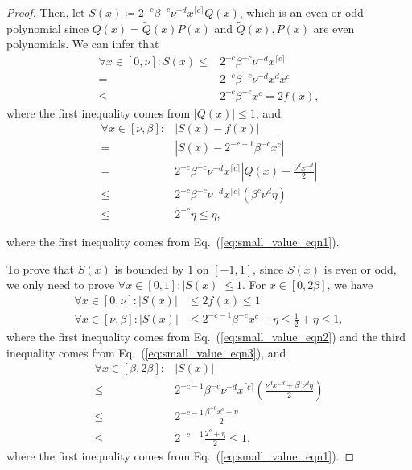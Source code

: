 \documentclass[journal]{IEEEtran}
\newcommand{\eq}[1]{Eq.~(\ref{eq:#1})}
\begin{document}
\begin{proof}
  Then, let $S(x) \coloneqq 2^{-c}\beta^{-c}\nu^{-d}x^{\lceil c\rceil}Q(x)$, which is an even or odd polynomial since $Q(x) = \tilde{Q}(x)P(x)$ and $\tilde{Q}(x),P(x)$ are even polynomials. We can infer that
  \begin{align}
    \label{eq:small_value_eqn2}
    \forall x \in [0,\nu]: S(x)\le & 2^{-c}\beta^{-c}\nu^{-d}x^{\lceil c \rceil} \nonumber \\= &  2^{-c}\beta^{-c}\nu^{-d}x^{d}x^{c} \nonumber \\ \le &  2^{-c}\beta^{-c}x^{c} = 2f(x),
  \end{align}
  where the first inequality comes from $|Q(x)|\le 1$, and
  \begin{align}
      \label{eq:small_value_eqn3}
      \forall x \in[\nu,\beta]: &|S(x)-f(x)| \nonumber \\
      = & |S(x)-2^{-c-1}\beta^{-c}x^c| \nonumber \\ =&2^{-c}\beta^{-c}\nu^{-d}x^{\lceil c \rceil}|Q(x)-\frac{\nu^dx^{-d}}{2}| \nonumber\\
      \le & 2^{-c}\beta^{-c}\nu^{-d}x^{\lceil c \rceil}(\beta^c\nu^d\eta)        \nonumber\\
      \le & 2^{-c}\eta \le \eta,
  \end{align}
  
  where the first inequality comes from \eq{small_value_eqn1}.

  To prove that $S(x)$ is bounded by $1$ on $[-1,1]$, since $S(x)$ is even or odd, we only need to prove $\forall x\in [0,1]: |S(x)|\le 1$.
  For $x\in[0,2\beta]$, we have
  \begin{align}
    \forall x \in [0,\nu]:|S(x)|     & \le 2f(x) \le 1   \nonumber                 \\
    \forall x\in [\nu,\beta]: |S(x)| & \le 2^{-c-1}\beta^{-c}x^{c} + \eta
    \le \frac{1}{2} + \eta
    \le 1                              ,
  \end{align}
  where the first inequality comes from \eq{small_value_eqn2} and the third inequality comes from \eq{small_value_eqn3}, and
  \begin{align}
    \forall x\in [\beta,2\beta]: & |S(x)| \nonumber \\
    \le & 2^{-c-1}\beta^{-c}\nu^{-d}x^{\lceil c \rceil}\left(\frac{\nu^dx^{-d}+\beta^c\nu^{d}\eta}{2}\right)\nonumber \\
    \le & 2^{-c-1}\frac{\beta^{-c}x^c+\eta}{2} \nonumber\\
    \le & 2^{-c-1}\frac{2^c+\eta}{2} \le 1,
  \end{align}
  where the first inequality comes from \eq{small_value_eqn1}.
  

\end{proof}
\end{document}
